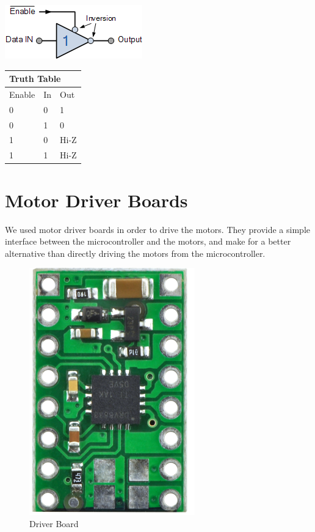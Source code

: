 \begin{minipage}{0.45\textwidth}
	\includegraphics[width=\textwidth]{figures/move/motor53}
\end{minipage}
\hfill
\begin{minipage}{0.45\textwidth}
	\centering
	\begin{tabular}{|l|l|l|}
	\hline
	\multicolumn{3}{|l|}{Truth Table} \\ \hline
	Enable      & In      & Out       \\ \hline
	0           & 0       & 1	      \\ \hline
	0           & 1       & 0	      \\ \hline
	1           & 0       & Hi-Z      \\ \hline
	1           & 1       & Hi-Z      \\ \hline
	\end{tabular}
\end{minipage}

\section{Motor Driver Boards}\label{sec:driver_boards}
We used motor driver boards in order to drive the motors. They provide a simple interface between the microcontroller and the motors, and make for a better alternative than directly driving the motors from the microcontroller.
\begin{figure}[htp]
	\centering
	\includegraphics[scale=0.5]{figures/move/driver_board}
	\caption{Driver Board}
\end{figure}
\clearpage
